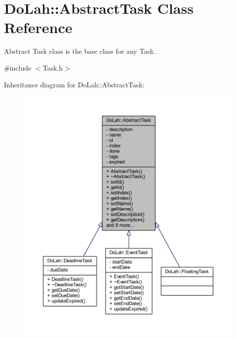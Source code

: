 \hypertarget{class_do_lah_1_1_abstract_task}{}\section{Do\+Lah\+:\+:Abstract\+Task Class Reference}
\label{class_do_lah_1_1_abstract_task}


Abstract Task class is the base class for any Task.  




{\ttfamily \#include $<$Task.\+h$>$}



Inheritance diagram for Do\+Lah\+:\+:Abstract\+Task\+:\nopagebreak
\begin{figure}[H]
\begin{center}
\leavevmode
\includegraphics[width=350pt]{class_do_lah_1_1_abstract_task__inherit__graph}
\end{center}
\end{figure}


